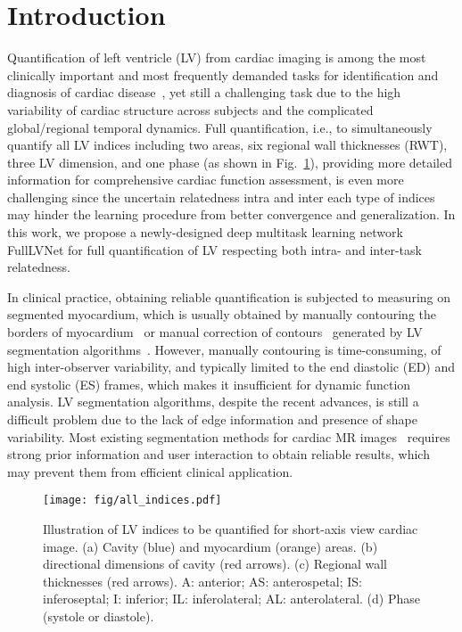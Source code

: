 \documentclass{llncs}
\begin{document}
\section{Introduction}

Quantification of left ventricle (LV) from cardiac imaging is among the most clinically important and most frequently demanded tasks for identification and diagnosis of cardiac disease~\cite{karamitsos2009role}, yet still a challenging task due to the high variability of cardiac structure across subjects and the complicated global/regional temporal dynamics. %
Full quantification, i.e., to simultaneously quantify all LV indices including two areas, six regional wall thicknesses (RWT), three LV dimension, and one phase (as shown in Fig.~\ref{fig_indices}), providing more detailed information for comprehensive cardiac function assessment, is even more challenging since the uncertain relatedness intra and inter each type of indices may hinder the learning procedure from better convergence and generalization. In this work, we propose a newly-designed deep multitask learning network FullLVNet for full quantification of LV respecting both intra- and inter-task relatedness.

In clinical practice, obtaining reliable quantification is subjected to measuring on segmented myocardium, which is usually obtained by manually contouring the borders of myocardium~\cite{suinesiaputra2015quantification} or manual correction of contours~\cite{attili2010quantification,kawel2015normal} generated by LV segmentation algorithms~\cite{peng2016review}. However, manually contouring is time-consuming, of high inter-observer variability, and typically limited to the end diastolic (ED) and end systolic (ES) frames, which makes it insufficient for dynamic function analysis. LV segmentation algorithms, despite the recent advances, is still a difficult problem due to the lack of edge information and presence of shape variability. Most existing segmentation methods for cardiac MR images~\cite{peng2016review,petitjean2011review,ayed2012max} requires strong prior information and user interaction to obtain reliable results, which may prevent them from efficient clinical application. 

\begin{figure}[t]
	\centering
	\texttt{[image: fig/all\_indices.pdf]}
	\caption{Illustration of LV indices to be quantified for short-axis view cardiac image. (a) Cavity (blue) and myocardium (orange) areas. (b) directional dimensions of cavity (red arrows). (c) Regional wall thicknesses (red arrows). A: anterior; AS: anterospetal; IS: inferoseptal; I: inferior;  IL: inferolateral; AL: anterolateral. (d) Phase (systole or diastole).}
	\label{fig_indices}
\end{figure}
\end{document}
